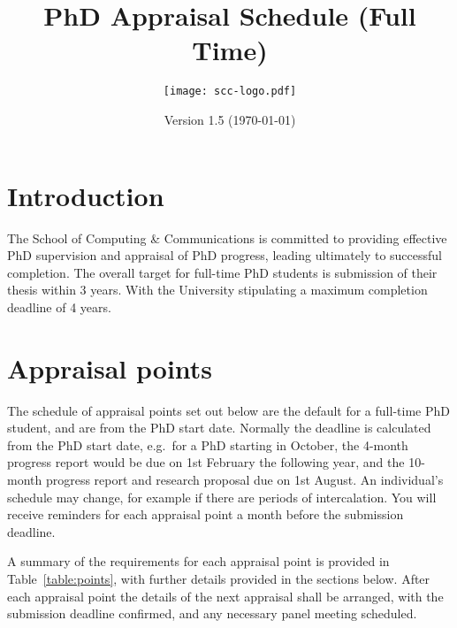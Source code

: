 \documentclass[12pt,a4paper]{article}
\title{PhD Appraisal Schedule (Full Time)}
\author{\texttt{[image: scc-logo.pdf]}}
\date{Version 1.5 (\today)}
\begin{document}
\maketitle

\section{Introduction}
The School of Computing \& Communications is committed to providing effective PhD supervision and appraisal of PhD progress, leading ultimately to successful completion. The overall target for full-time PhD students is submission of their thesis within 3 years. With the University stipulating a maximum completion deadline of 4 years.





\section{Appraisal points} \label{sec:points}

The schedule of appraisal points set out below are the default for a full-time PhD student, and are from the PhD start date. Normally the deadline is calculated from the PhD start date, e.g.\ for a PhD starting in October, the 4-month progress report would be due on 1st February the following year, and the 10-month progress report and research proposal due on 1st August. An individual's schedule may change, for example if there are periods of intercalation. You will receive reminders for each appraisal point a month before the submission deadline.

A summary of the requirements for each appraisal point is provided in Table~\ref{table:points}, with further details provided in the sections below. After each appraisal point the details of the next appraisal shall be arranged, with the submission deadline confirmed, and any necessary panel meeting scheduled.
\end{document}
